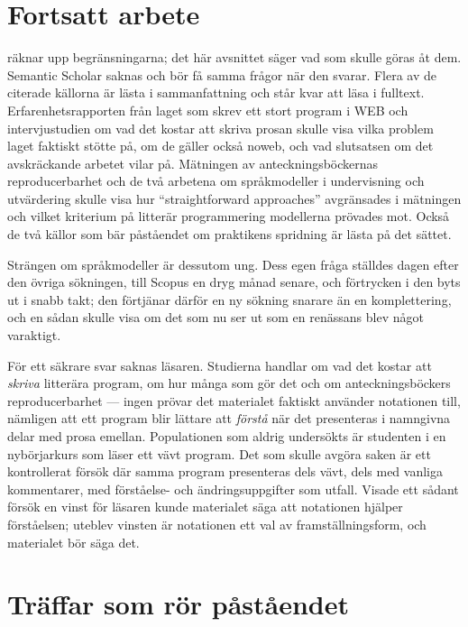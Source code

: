 \section{Fortsatt arbete}
\label{sec:litprog-fortsatt}

 räknar upp begränsningarna; det här
avsnittet säger vad som skulle göras åt dem.  Semantic Scholar saknas
och bör få samma frågor när den svarar.  Flera av de
citerade källorna är lästa i sammanfattning och står kvar att läsa i
fulltext.  Erfarenhetsrapporten från laget som skrev ett stort program i
WEB och intervjustudien om vad det kostar att skriva
prosan\autocite{ramseyMarceau1991,park2018} skulle visa vilka problem
laget faktiskt stötte på, om de gäller också noweb, och vad slutsatsen
om det avskräckande arbetet vilar på.  Mätningen av
anteckningsböckernas reproducerbarhet och de två arbetena om
språkmodeller i undervisning och
utvärdering\autocite{wang2020,sunStaron2026,rosiene2024} skulle visa hur
\enquote{straightforward approaches} avgränsades i mätningen och vilket
kriterium på litterär programmering modellerna prövades mot.  Också de
två källor som bär påståendet om praktikens
spridning\autocite{haghish2016,normark2000} är lästa på det sättet.

Strängen om språkmodeller är dessutom ung.  Dess egen fråga ställdes
dagen efter den övriga sökningen, till Scopus en dryg månad senare, och förtrycken i den byts ut i
snabb takt; den förtjänar därför en ny sökning snarare än en
komplettering, och en sådan skulle visa om det som nu ser ut som en
renässans blev något varaktigt.

För ett säkrare svar saknas läsaren.  Studierna handlar om vad det
kostar att \emph{skriva} litterära program, om hur många som gör det och
om anteckningsböckers reproducerbarhet --- ingen prövar det materialet
faktiskt använder notationen till, nämligen att ett program blir lättare
att \emph{förstå} när det presenteras i namngivna delar med prosa
emellan.  Populationen som aldrig undersökts är studenten i en
nybörjarkurs som läser ett vävt program.  Det som skulle avgöra saken är
ett kontrollerat försök där samma program presenteras dels vävt, dels
med vanliga kommentarer, med förståelse- och ändringsuppgifter som
utfall.  Visade ett sådant försök en vinst för läsaren kunde materialet
säga att notationen hjälper förståelsen; uteblev vinsten är notationen
ett val av framställningsform, och materialet bör säga det.

\section{Träffar som rör påståendet}
\label{sec:litprog-traffar}

